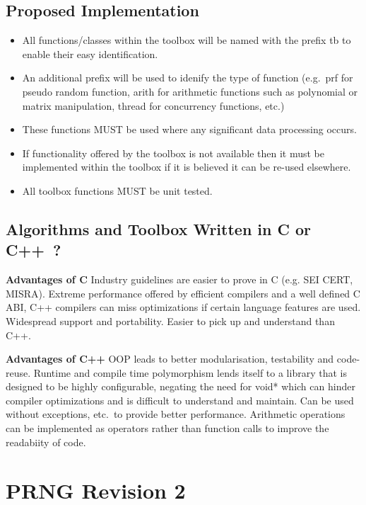 \subsection{Proposed Implementation}

\begin{itemize}
\item All functions/classes within the toolbox will be named with the prefix tb to enable their easy identification.
\item An additional prefix will be used to idenify the type of function (e.g.\ prf for pseudo random function, arith for arithmetic functions such as polynomial or matrix manipulation, thread for concurrency functions, etc.)
\item These functions MUST be used where any significant data processing occurs.
\item If functionality offered by the toolbox is not available then it must be implemented within the toolbox if it is believed it can be re-used elsewhere.
\item All toolbox functions MUST be unit tested.
\end{itemize}


\subsection{Algorithms and Toolbox Written in C or C++~?}

\textbf{Advantages of C}
Industry guidelines are easier to prove in C (e.g. SEI CERT, MISRA).
Extreme performance offered by efficient compilers and a well defined C ABI, C++ compilers can miss optimizations if certain language features are used.
Widespread support and portability.
Easier to pick up and understand than C++.

\textbf{Advantages of C++}
OOP leads to better modularisation, testability and code-reuse.
Runtime and compile time polymorphism lends itself to a library that is designed to be highly configurable, negating the need for void* which can hinder compiler optimizations and is difficult to understand and maintain.
Can be used without exceptions, etc.\ to provide better performance.
Arithmetic operations can be implemented as operators rather than function calls to improve the readabiity of code.


\newpage
\section{PRNG Revision 2}

